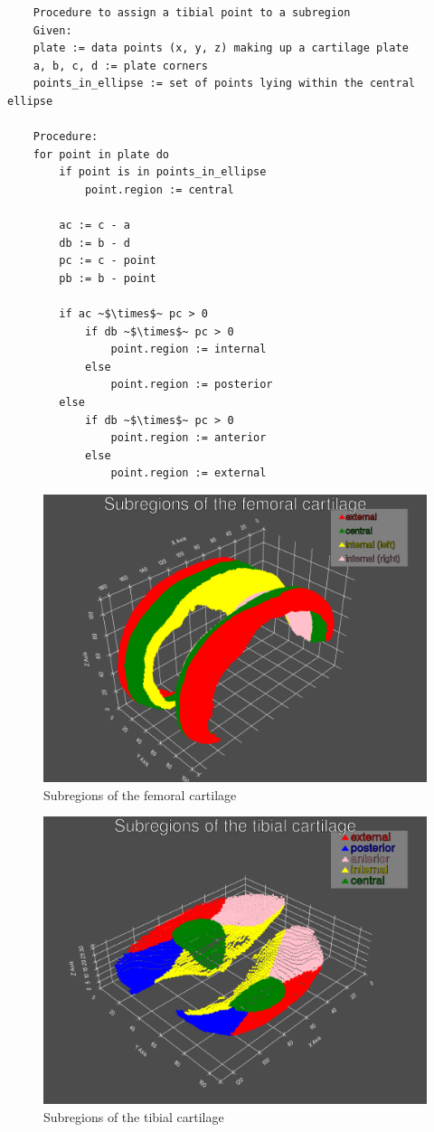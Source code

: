 \begin{verbatim}
	Procedure to assign a tibial point to a subregion
	Given:
	plate := data points (x, y, z) making up a cartilage plate
	a, b, c, d := plate corners
	points_in_ellipse := set of points lying within the central ellipse
	
	Procedure:
	for point in plate do
		if point is in points_in_ellipse
			point.region := central
			
		ac := c - a
		db := b - d
		pc := c - point
		pb := b - point
		
		if ac ~$\times$~ pc > 0
			if db ~$\times$~ pc > 0
				point.region := internal
			else
				point.region := posterior
		else
			if db ~$\times$~ pc > 0
				point.region := anterior
			else
				point.region := external
\end{verbatim}

\begin{figure}[htb!]
	\centering
	\includegraphics[width=\linewidth]{./figures/femoral_subregions}
	\caption{Subregions of the femoral cartilage}
	\label{fig:femoral_subregions}
\end{figure}

\begin{figure}[htb!]
	\centering
	\includegraphics[width=\linewidth]{./figures/tibial_subregions}
	\caption{Subregions of the tibial cartilage}
	\label{fig:tibial_subregions}
\end{figure}